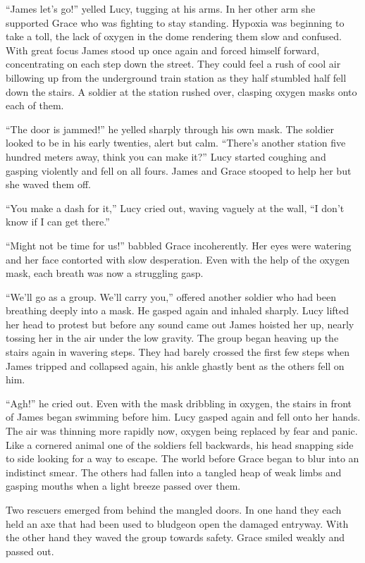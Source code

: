 \documentclass[openany, 12pt]{book} %
\begin{document}
``James let's go!'' yelled Lucy, tugging at his arms. In her other arm she supported Grace who was fighting to stay standing. Hypoxia was beginning to take a toll, the lack of oxygen in the dome rendering them slow and confused. With great focus James stood up once again and forced himself forward, concentrating on each step down the street. They could feel a rush of cool air billowing up from the underground train station as they half stumbled half fell down the stairs. A soldier at the station rushed over, clasping oxygen masks onto each of them.

``The door is jammed!'' he yelled sharply through his own mask. The soldier looked to be in his early twenties, alert but calm. ``There's another station five hundred meters away, think you can make it?'' Lucy started coughing and gasping violently and fell on all fours. James and Grace stooped to help her but she waved them off.

``You make a dash for it,'' Lucy cried out, waving vaguely at the wall, ``I don't know if I can get there.''

``Might not be time for us!'' babbled Grace incoherently. Her eyes were watering and her face contorted with slow desperation. Even with the help of the oxygen mask, each breath was now a struggling gasp.

``We'll go as a group. We'll carry you,'' offered another soldier who had been breathing deeply into a mask. He gasped again and inhaled sharply. Lucy lifted her head to protest but before any sound came out James hoisted her up, nearly tossing her in the air under the low gravity. The group began heaving up the stairs again in wavering steps. They had barely crossed the first few steps when James tripped and collapsed again, his ankle ghastly bent as the others fell on him.

``Agh!'' he cried out. Even with the mask dribbling in oxygen, the stairs in front of James began swimming before him. Lucy gasped again and fell onto her hands. The air was thinning more rapidly now, oxygen being replaced by fear and panic. Like a cornered animal one of the soldiers fell backwards, his head snapping side to side looking for a way to escape. The world before Grace began to blur into an indistinct smear. The others had fallen into a tangled heap of weak limbs and gasping mouths when a light breeze passed over them.

Two rescuers emerged from behind the mangled doors. In one hand they each held an axe that had been used to bludgeon open the damaged entryway. With the other hand they waved the group towards safety. Grace smiled weakly and passed out.
\end{document}
